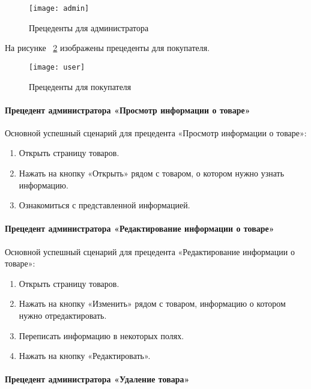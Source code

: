 \begin{figure}[h!]
	\texttt{[image: admin]}
	\caption{Прецеденты для администратора}
	\label{admin:image}
\end{figure}

На рисунке ~\ref{user:image} изображены прецеденты для покупателя.
\begin{figure}[h!]
	\texttt{[image: user]}
	\caption{Прецеденты для покупателя}
	\label{user:image}
\end{figure}


\paragraph{Прецедент администратора «Просмотр информации о товаре»}

Основной успешный сценарий для прецедента «Просмотр информации о товаре»:
\begin{enumerate}
	\item Открыть страницу товаров.
	\item Нажать на кнопку «Открыть» рядом с товаром, о котором нужно узнать информацию.
	\item Ознакомиться с представленной информацией.
\end{enumerate}

\paragraph{Прецедент администратора «Редактирование информации о товаре»}

Основной успешный сценарий для прецедента «Редактирование информации о товаре»:
\begin{enumerate}
	\item Открыть страницу товаров.
	\item Нажать на кнопку «Изменить» рядом с товаром, информацию о котором нужно отредактировать.
	\item Переписать информацию в некоторых полях.
	\item Нажать на кнопку «Редактировать».
\end{enumerate}

\paragraph{Прецедент администратора «Удаление товара»}

